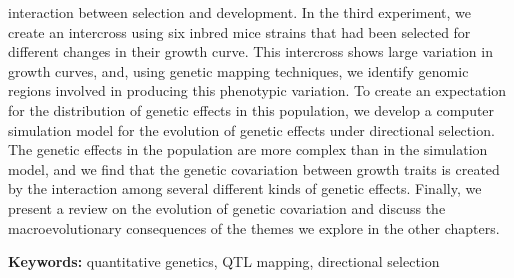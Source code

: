 interaction between selection and development. In the third experiment, we create an intercross using six inbred mice strains that had been selected for different changes in their growth curve. This intercross shows large variation in growth curves, and, using genetic mapping techniques, we identify genomic regions involved in producing this phenotypic variation. To create an expectation for the distribution of genetic effects in this population, we develop a computer simulation model for the evolution of genetic effects under directional selection. The genetic effects in the population are more complex than in the simulation model, and we find that the genetic covariation between growth traits is created by the interaction among several different kinds of genetic effects. Finally, we present a review on the evolution of genetic covariation and discuss the macroevolutionary consequences of the themes we explore in the other chapters.
\par
\vspace{1em}
\noindent\textbf{Keywords:} quantitative genetics, QTL mapping, directional selection


\newpage


\listoffigures

\listoftables


\tableofcontents

